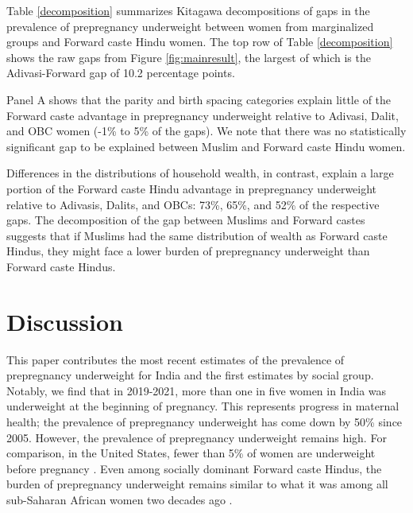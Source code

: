 \documentclass[12pt]{article}
\begin{document}
Table \ref{decomposition} summarizes Kitagawa decompositions of gaps in the prevalence of prepregnancy underweight between women from marginalized groups and Forward caste Hindu women.  The top row of Table \ref{decomposition} shows the raw gaps from Figure \ref{fig:mainresult}, the largest of which is the Adivasi-Forward gap of 10.2 percentage points.

Panel A shows that the parity and birth spacing categories explain little of the Forward caste advantage in prepregnancy underweight relative to Adivasi, Dalit, and OBC women (-1\% to 5\% of the gaps).  We note that there was no statistically significant gap to be explained between Muslim and Forward caste Hindu women.

Differences in the distributions of household wealth, in contrast, explain a large portion of the Forward caste Hindu advantage in prepregnancy underweight relative to Adivasis, Dalits, and OBCs: 73\%, 65\%, and 52\% of the respective gaps.  The decomposition of the gap between Muslims and Forward castes suggests that if Muslims had the same distribution of wealth as Forward caste Hindus, they might face a lower burden of prepregnancy underweight than Forward caste Hindus. 

\section{Discussion}

This paper contributes the most recent estimates of the prevalence of prepregnancy underweight for India and the first estimates by social group. Notably, we find that in 2019-2021, more than one in five women in India was underweight at the beginning of pregnancy.  This represents progress in maternal health; the prevalence of prepregnancy underweight has come down by 50\% since 2005.  However, the prevalence of prepregnancy underweight remains high.  For comparison, in the United States, fewer than 5\% of women are underweight before pregnancy \citep{zong2022maternal}. Even among socially dominant Forward caste Hindus, the burden of prepregnancy underweight remains similar to what it was among all sub-Saharan African women two decades ago \citep{coffey2015prepregnancy}.  
\end{document}
